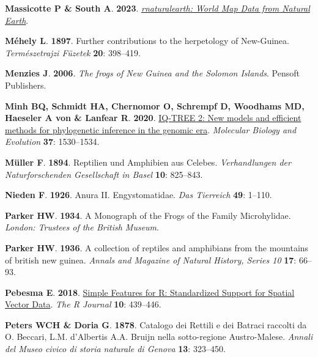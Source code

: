 \documentclass[
  letterpaper,
  DIV=11,
  numbers=noendperiod]{scrartcl}
\newlength{\cslhangindent}
\newenvironment{CSLReferences}[2] %
 {\begin{list}{}{%
  \setlength{\itemindent}{0pt}
  \setlength{\leftmargin}{0pt}
  \setlength{\parsep}{0pt}
  \ifodd #1
   \setlength{\leftmargin}{\cslhangindent}
   \setlength{\itemindent}{-1\cslhangindent}
  \fi
  \setlength{\itemsep}{#2\baselineskip}}}
 {\end{list}}
\begin{document}
\begin{CSLReferences}{0}{1}
\textbf{\textbf{Massicotte P} \& \textbf{South A}}. \textbf{2023}.
\emph{\href{https://CRAN.R-project.org/package=rnaturalearth}{{rnaturalearth:
World Map Data from Natural Earth}}}.

\textbf{\textbf{Méhely L}}. \textbf{1897}. {Further contributions to the
herpetology of New-Guinea}. \emph{Term{é}szetrajzi F{ü}zetek}
\textbf{20}: 398--419.

\textbf{\textbf{Menzies J}}. \textbf{2006}. \emph{{The frogs of New
Guinea and the Solomon Islands}}. Pensoft Publishers.

\textbf{\textbf{Minh BQ}, \textbf{Schmidt HA}, \textbf{Chernomor O},
\textbf{Schrempf D}, \textbf{Woodhams MD}, \textbf{Haeseler A von} \&
\textbf{Lanfear R}}. \textbf{2020}.
\href{https://doi.org/10.1093/molbev/msaa015}{IQ-TREE 2: New models and
efficient methods for phylogenetic inference in the genomic era}.
\emph{Molecular Biology and Evolution} \textbf{37}: 1530--1534.

\textbf{\textbf{Müller F}}. \textbf{1894}. {Reptilien und Amphibien aus
Celebes}. \emph{Verhandlungen der Naturforschenden Gesellschaft in
Basel} \textbf{10}: 825--843.

\textbf{\textbf{Nieden F}}. \textbf{1926}. {Anura II. Engystomatidae}.
\emph{Das Tierreich} \textbf{49}: 1--110.

\textbf{\textbf{Parker HW}}. \textbf{1934}. {A Monograph of the Frogs of
the Family Microhylidae}. \emph{London: Trustees of the British Museum}.

\textbf{\textbf{Parker HW}}. \textbf{1936}. A collection of reptiles and
amphibians from the mountains of british new guinea. \emph{Annals and
Magazine of Natural History, Series 10} \textbf{17}: 66--93.

\textbf{\textbf{Pebesma E}}. \textbf{2018}.
\href{https://doi.org/10.32614/RJ-2018-009}{{Simple Features for R:
Standardized Support for Spatial Vector Data}}. \emph{{The R Journal}}
\textbf{10}: 439--446.

\textbf{\textbf{Peters WCH} \& \textbf{Doria G}}. \textbf{1878}.
{Catalogo dei Rettili e dei Batraci raccolti da O. Beccari, L.M.
d'Albertis A.A. Bruijn nella sotto-regione Austro-Malese}. \emph{Annali
del Museo civico di storia naturale di Genova} \textbf{13}: 323--450.


\end{CSLReferences}
\end{document}

